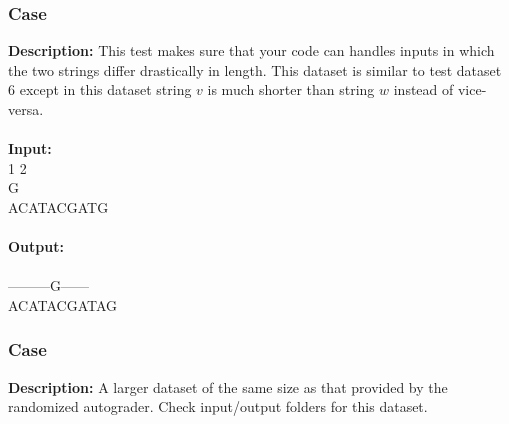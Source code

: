 \documentclass{article}
\newcommand{\code}[1]{{\fontfamily{pcr}\selectfont #1}}
\begin{document}
\subsubsection*{Case }
\hline \vspace{5}
\textbf{Description:} This test makes sure that your code can handles inputs in which the two strings differ drastically in length. This dataset is similar to test dataset $6$ except in this dataset string $v$ is much shorter than string $w$ instead of vice-versa.\\ \\
\noindent \textbf{Input:}\\
\code{3 1 2\\G\\ACATACGATG}\\ \\
\noindent \textbf{Output:}\\
\code{-15\\---------G------\\ACATACGATAG}

\subsubsection*{Case }
\hline \vspace{5}
\textbf{Description:} A larger dataset of the same size as that provided by the randomized autograder. Check input/output folders for this dataset.\\ \\
\pagebreak
\end{document}
